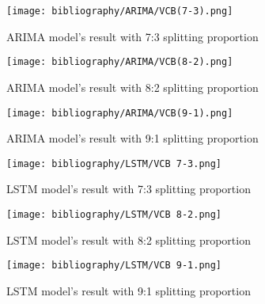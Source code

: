 \documentclass{ieeeojies}
\begin{document}

\begin{figure}[H]
  \centering
  \begin{minipage}{0.8\linewidth}
    \centering
    \texttt{[image: bibliography/ARIMA/VCB(7-3).png]}
    \caption{ARIMA model's result with 7:3 splitting proportion}
    \label{fig8}
  \end{minipage}
\end{figure}

\begin{figure}[H]
  \centering
  \begin{minipage}{0.8\linewidth}
    \centering
    \texttt{[image: bibliography/ARIMA/VCB(8-2).png]}
    \caption{ARIMA model's result with 8:2 splitting proportion}
    \label{fig8}
  \end{minipage}
\end{figure}

\begin{figure}[H]
  \centering
  \begin{minipage}{0.8\linewidth}
    \centering
    \texttt{[image: bibliography/ARIMA/VCB(9-1).png]}
    \caption{ARIMA model's result with 9:1 splitting proportion}
    \label{fig8}
  \end{minipage}
\end{figure}


\begin{figure}[H]
  \centering
  \begin{minipage}{0.8\linewidth}
    \centering
    \texttt{[image: bibliography/LSTM/VCB 7-3.png]}
    \caption{LSTM model's result with 7:3 splitting proportion}
    \label{fig8}
  \end{minipage}
\end{figure}

\begin{figure}[H]
  \centering
  \begin{minipage}{0.8\linewidth}
    \centering
    \texttt{[image: bibliography/LSTM/VCB 8-2.png]}
    \caption{LSTM model's result with 8:2 splitting proportion}
    \label{fig8}
  \end{minipage}
\end{figure}

\begin{figure}[H]
  \centering
  \begin{minipage}{0.8\linewidth}
    \centering
    \texttt{[image: bibliography/LSTM/VCB 9-1.png]}
    \caption{LSTM model's result with 9:1 splitting proportion}
    \label{fig8}
  \end{minipage}
\end{figure}
\end{document}
